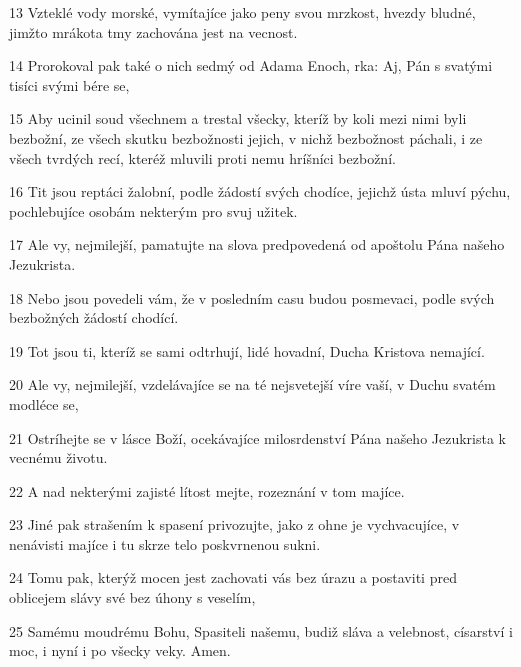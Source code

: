\par 13 Vzteklé vody morské, vymítajíce jako peny svou mrzkost, hvezdy bludné, jimžto mrákota tmy zachována jest na vecnost.
\par 14 Prorokoval pak také o nich sedmý od Adama Enoch, rka: Aj, Pán s svatými tisíci svými bére se,
\par 15 Aby ucinil soud všechnem a trestal všecky, kteríž by koli mezi nimi byli bezbožní, ze všech skutku bezbožnosti jejich, v nichž bezbožnost páchali, i ze všech tvrdých recí, kteréž mluvili proti nemu hríšníci bezbožní.
\par 16 Tit jsou reptáci žalobní, podle žádostí svých chodíce, jejichž ústa mluví pýchu, pochlebujíce osobám nekterým pro svuj užitek.
\par 17 Ale vy, nejmilejší, pamatujte na slova predpovedená od apoštolu Pána našeho Jezukrista.
\par 18 Nebo jsou povedeli vám, že v posledním casu budou posmevaci, podle svých bezbožných žádostí chodící.
\par 19 Tot jsou ti, kteríž se sami odtrhují, lidé hovadní, Ducha Kristova nemající.
\par 20 Ale vy, nejmilejší, vzdelávajíce se na té nejsvetejší víre vaší, v Duchu svatém modléce se,
\par 21 Ostríhejte se v lásce Boží, ocekávajíce milosrdenství Pána našeho Jezukrista k vecnému životu.
\par 22 A nad nekterými zajisté lítost mejte, rozeznání v tom majíce.
\par 23 Jiné pak strašením k spasení privozujte, jako z ohne je vychvacujíce, v nenávisti majíce i tu skrze telo poskvrnenou sukni.
\par 24 Tomu pak, kterýž mocen jest zachovati vás bez úrazu a postaviti pred oblicejem slávy své bez úhony s veselím,
\par 25 Samému moudrému Bohu, Spasiteli našemu, budiž sláva a velebnost, císarství i moc, i nyní i po všecky veky. Amen.


